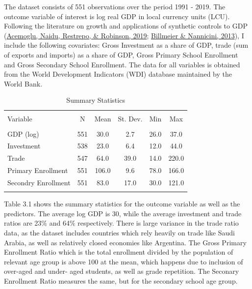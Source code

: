 \documentclass[12pt,nobind, a4paper]{reedthesis}
\begin{document}
 The dataset consists of 551 observations over the period 1991 - 2019. The outcome variable of interest is log real GDP in local currency units (LCU). Following the literature on growth and applications of synthetic controls to GDP (\protect\hyperlink{ref-acemoglu_democracy_2019}{Acemoglu, Naidu, Restrepo, \& Robinson, 2019}; \protect\hyperlink{ref-billmeier_assessing_2013}{Billmeier \& Nannicini, 2013}), I include the following covariates: Gross Investment as a share of GDP, trade (sum of exports and imports) as a share of GDP, Gross Primary School Enrollment and Gross Secondary School Enrollment. The data for all variables is obtained from the World Development Indicators (WDI) database maintained by the World Bank.
 \linebreak
 \begin{table}[!htbp] \centering 
   \caption{ Summary Statistics} 
   \label{} 
 \begin{tabular}{@{\extracolsep{5pt}}lccccc} 
 \\[-1.8ex]\hline 
 \hline \\[-1.8ex] 
 Variable & \multicolumn{1}{c}{N} & \multicolumn{1}{c}{Mean} & \multicolumn{1}{c}{St. Dev.} & \multicolumn{1}{c}{Min} & \multicolumn{1}{c}{Max} \\ 
 \hline \\[-1.8ex] 
 GDP (log) & 551 & 30.0 & 2.7 & 26.0 & 37.0 \\ 
 Investment & 538 & 23.0 & 6.4 & 12.0 & 44.0 \\ 
 Trade & 547 & 64.0 & 39.0 & 14.0 & 220.0 \\ 
 Primary Enrollment & 551 & 106.0 & 9.6 & 78.0 & 166.0 \\ 
 Secondry Enrollment & 551 & 83.0 & 17.0 & 30.0 & 121.0 \\ 
 \hline \\[-1.8ex] 
 \end{tabular} 
 \end{table}
 Table 3.1 shows the summary statistics for the outcome variable as well as the predictors. The average log GDP is 30, while the average investment and trade ratios are 23\% and 64\% respectively. There is large variance in the trade ratio data, as the dataset includes countries which rely heavily on trade like Saudi Arabia, as well as relatively closed economies like Argentina. The Gross Primary Enrollment Ratio which is the total enrollment divided by the population of relevant age group is above 100 at the mean, which happens due to inclusion of over-aged and under- aged students, as well as grade repetition. The Seconary Enrollment Ratio measures the same, but for the secondary school age group.
 \linebreak
\end{document}
